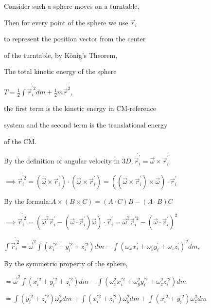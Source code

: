 \documentclass{article}
\begin{document}
Consider such a sphere moves on a turntable, 

Then for every point of the sphere we use $\vec{r}_{i}$ 

to represent the position vector from the center 

of the turntable, by K\"{o}nig's Theorem, 

The total kinetic energy of the sphere

$T=\frac{1}{2}\int \overset{\cdot }{\vec{r}_{i}^{^{\prime }2}}dm+\frac{1}{2}m%
\overset{\cdot }{\vec{r}^{2}},$

the first term is the kinetic energy in CM-reference

system and the second term is the translational energy

of the CM. 

By the definition of angular velocity in $3D,\overset{\cdot }{\vec{r}%
_{i}^{\prime }}=\vec{\omega}\times \vec{r}_{i}^{\prime }$

$\implies \overset{\cdot }{\vec{r}_{i}^{^{\prime }2}}=\left( \vec{\omega}%
\times \vec{r}_{i}^{\prime }\right) \cdot \left( \vec{\omega}\times \vec{r}%
_{i}^{\prime }\right) =\left( \left( \vec{\omega}\times \vec{r}_{i}^{\prime
}\right) \times \vec{\omega}\right) \cdot \vec{r}_{i}^{\prime }$

By the formula:$A\times \left( B\times C\right) =\left( A\cdot C\right)
B-\left( A\cdot B\right) C$

$\implies \overset{\cdot }{\vec{r}_{i}^{^{\prime }2}}=\left( \vec{\omega}^{2}%
\vec{r}_{i}^{\prime }-\left( \vec{\omega}\cdot \vec{r}_{i}^{\prime }\right) 
\vec{\omega}\right) \cdot \vec{r}_{i}^{\prime }=\vec{\omega}^{2}\vec{r}%
_{i}^{\prime 2}-\left( \vec{\omega}\cdot \vec{r}_{i}^{\prime }\right) ^{2}$

$\int \overset{\cdot }{\vec{r}_{i}^{^{\prime }2}}=\vec{\omega}^{2}\int
\left( x_{i}^{\prime 2}+y_{i}^{\prime 2}+z_{i}^{\prime 2}\right) dm-\int
\left( \omega _{x}x_{i}^{\prime }+\omega _{y}y_{i}^{\prime }+\omega
_{z}z_{i}^{\prime }\right) ^{2}dm,$

By the symmetric property of the sphere, 

$=\vec{\omega}^{2}\int \left( x_{i}^{\prime 2}+y_{i}^{\prime
2}+z_{i}^{\prime 2}\right) dm-\int \left( \omega _{x}^{2}x_{i}^{\prime
2}+\omega _{y}^{2}y_{i}^{\prime 2}+\omega _{z}^{2}z_{i}^{\prime 2}\right) dm$

$=\int \left( y_{i}^{\prime 2}+z_{i}^{\prime 2}\right) \omega
_{x}^{2}dm+\int \left( x_{i}^{\prime 2}+z_{i}^{\prime 2}\right) \omega
_{y}^{2}dm+\int \left( x_{i}^{\prime 2}+y_{i}^{\prime 2}\right) \omega
_{z}^{2}dm$
\end{document}
